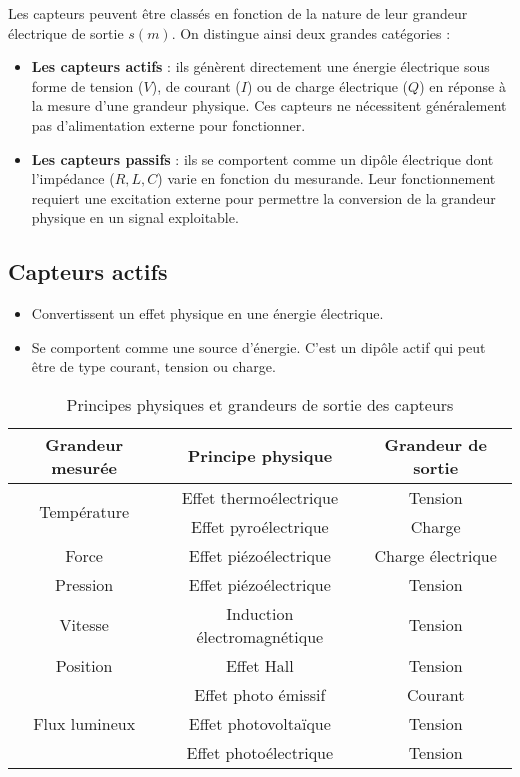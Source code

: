 Les capteurs peuvent être classés en fonction de la nature de leur grandeur 
électrique de sortie \( s(m) \). On distingue ainsi deux grandes catégories :  

\begin{itemize}
    \item \textbf{Les capteurs actifs} : ils génèrent directement une énergie 
    électrique sous forme de tension (\( V \)), de courant (\( I \)) ou de 
    charge électrique (\( Q \)) en réponse à la mesure d'une grandeur physique. 
    Ces capteurs ne nécessitent généralement pas d'alimentation externe pour 
    fonctionner.  
    \item \textbf{Les capteurs passifs} : ils se comportent comme un dipôle 
    électrique dont l'impédance (\( R, L, C \)) varie en fonction du mesurande. 
    Leur fonctionnement requiert une excitation externe pour permettre la 
    conversion de la grandeur physique en un signal exploitable.  
\end{itemize}

\subsection{Capteurs actifs}
\begin{itemize}
    \item Convertissent un effet physique en une énergie électrique.
    \item Se comportent comme une source d'énergie. C'est un dipôle actif qui 
    peut être de type courant, tension ou charge.
\end{itemize}

\begin{table}[h]
    \centering
    \renewcommand{\arraystretch}{1.3} %
    \begin{tabular}{|c|c|c|}
        \hline
        \textbf{Grandeur mesurée} & \textbf{Principe physique} & \textbf{Grandeur de sortie} \\
        \hline
        \multirow{2}{*}{Température} & Effet thermoélectrique & Tension \\
        & Effet pyroélectrique & Charge \\
        \hline
        Force & Effet piézoélectrique & Charge électrique \\
        \hline
        Pression & Effet piézoélectrique & Tension \\
        \hline
        Vitesse & Induction électromagnétique & Tension \\
        \hline
        Position & Effet Hall & Tension \\
        \hline
        \multirow{3}{*}{Flux lumineux} & Effet photo émissif & Courant \\
        & Effet photovoltaïque & Tension \\
        & Effet photoélectrique & Tension \\
        \hline
    \end{tabular}
    \caption{Principes physiques et grandeurs de sortie des capteurs}
    \label{tabCapteurs}
\end{table}

